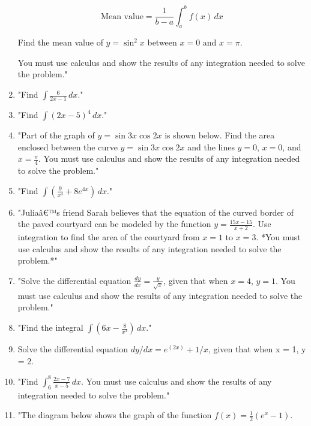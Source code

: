 \documentclass{article}
\begin{document}
\begin{enumerate}
\[
\text{Mean value} = \frac{1}{b-a} \int_{a}^{b} f(x) \, dx
\]

Find the mean value of \( y = \sin^2 x \) between \( x = 0 \) and \( x = \pi \).

You must use calculus and show the results of any integration needed to solve the problem."
\vspace{3cm}
\item "Find \(\int \frac{6}{2x-1} \, dx\)."
\vspace{3cm}
\item "Find \(\int (2x-5)^4 \, dx\)."
\vspace{3cm}
\item "Part of the graph of \( y = \sin 3x \cos 2x \) is shown below. Find the area enclosed between the curve \( y = \sin 3x \cos 2x \) and the lines \( y = 0 \), \( x = 0 \), and \( x = \frac{\pi}{4} \). You must use calculus and show the results of any integration needed to solve the problem."
\vspace{3cm}
\item "Find \(\int \left( \frac{9}{x^4} + 8e^{4x} \right) \, dx\)."
\vspace{3cm}
\item "Juliaâ€™s friend Sarah believes that the equation of the curved border of the paved courtyard can be modeled by the function \( y = \frac{15x - 15}{x + 2} \). Use integration to find the area of the courtyard from \( x = 1 \) to \( x = 3 \). *You must use calculus and show the results of any integration needed to solve the problem.*"
\vspace{3cm}
\item "Solve the differential equation \(\frac{dy}{dx} = \frac{y}{\sqrt{x}}\), given that when \(x = 4\), \(y = 1\). You must use calculus and show the results of any integration needed to solve the problem."
\vspace{3cm}
\item "Find the integral \(\int \left( 6x - \frac{8}{x^3} \right) \, dx\)."
\vspace{3cm}
\item Solve the differential equation \(dy/dx = e^(2x) + 1/x\), given that when x = 1, y = 2.
\vspace{3cm}
\item "Find \(\int_{6}^{8} \frac{2x - 7}{x - 5} \, dx\). You must use calculus and show the results of any integration needed to solve the problem."
\vspace{3cm}
\item "The diagram below shows the graph of the function \( f(x) = \frac{1}{2} (e^x - 1) \).


\end{enumerate}
\end{document}
